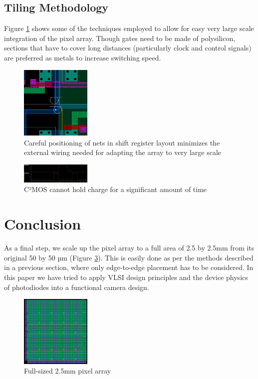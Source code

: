 \documentclass[lettersize,journal]{IEEEtran}
\begin{document}
\subsection{Tiling Methodology}
Figure \ref{qdcontact} shows some of the techniques employed to allow for easy very large scale integration of the pixel array. Though gates need to be made of polysilicon, sections that have to cover long distances (particularly clock and control signals) are preferred as metals to increase switching speed.
\begin{figure}[h]
	\centering
	\includegraphics[width =0.3\textwidth]{qdcontact.png}
	\caption{Careful positioning of nets in shift register layout minimizes the external wiring needed for adapting the array to very large scale}
	\label{qdcontact}
\end{figure}


\begin{figure}[h]
	\centering
	\includegraphics[width =0.3\textwidth]{cmosyangwei.png}
	\caption{C²MOS cannot hold charge for a significant amount of time}
	\label{cmosyangwei}
\end{figure}

\section{Conclusion}
As a final step, we scale up the pixel array to a full area of 2.5 by 2.5mm from its original 50 by 50 µm (Figure \ref{fullframe}). This is easily done as per the methods described in a previous section, where only edge-to-edge placement has to be considered.
In this paper we have tried to apply VLSI design principles and the device physics of photodiodes into a functional camera design.
\begin{figure}[h]
	\centering
	\includegraphics[width =0.3\textwidth]{fullframe.png}
	\caption{Full-sized 2.5mm pixel array}
	\label{fullframe}
\end{figure}
\end{document}
